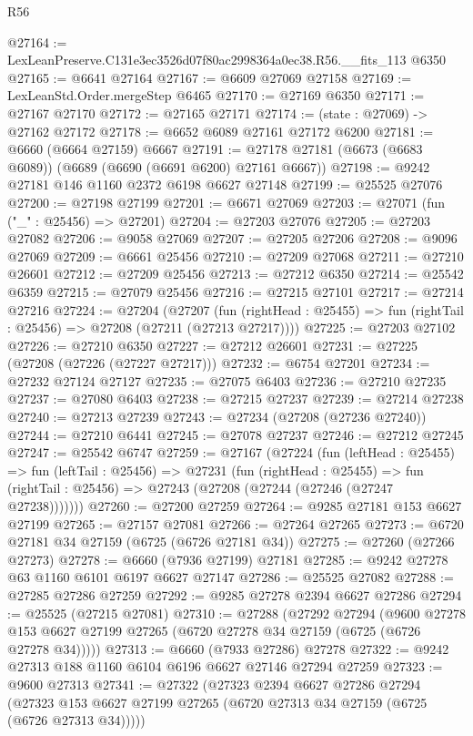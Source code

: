 \begin{lexlean}{R56}
\begin{coremodule}
@27164 := LexLeanPreserve.C131e3ec3526d07f80ac2998364a0ec38.R56.__fits_113 @6350
@27165 := @6641 @27164
@27167 := @6609 @27069 @27158
@27169 := LexLeanStd.Order.mergeStep @6465
@27170 := @27169 @6350
@27171 := @27167 @27170
@27172 := @27165 @27171
@27174 := (state : @27069) -> @27162 @27172
@27178 := @6652 @6089 @27161 @27172 @6200
@27181 := @6660 (@6664 @27159) @6667
@27191 := @27178 @27181 (@6673 (@6683 @6089)) (@6689 (@6690 (@6691 @6200) @27161 @6667))
@27198 := @9242 @27181 @146 @1160 @2372 @6198 @6627 @27148
@27199 := @25525 @27076
@27200 := @27198 @27199
@27201 := @6671 @27069
@27203 := @27071 (fun ("_" : @25456) => @27201)
@27204 := @27203 @27076
@27205 := @27203 @27082
@27206 := @9058 @27069
@27207 := @27205 @27206
@27208 := @9096 @27069
@27209 := @6661 @25456
@27210 := @27209 @27068
@27211 := @27210 @26601
@27212 := @27209 @25456
@27213 := @27212 @6350
@27214 := @25542 @6359
@27215 := @27079 @25456
@27216 := @27215 @27101
@27217 := @27214 @27216
@27224 := @27204
    (@27207
      (fun (rightHead : @25455) => fun (rightTail : @25456) => @27208 (@27211 (@27213 @27217))))
@27225 := @27203 @27102
@27226 := @27210 @6350
@27227 := @27212 @26601
@27231 := @27225 (@27208 (@27226 (@27227 @27217)))
@27232 := @6754 @27201
@27234 := @27232 @27124 @27127
@27235 := @27075 @6403
@27236 := @27210 @27235
@27237 := @27080 @6403
@27238 := @27215 @27237
@27239 := @27214 @27238
@27240 := @27213 @27239
@27243 := @27234 (@27208 (@27236 @27240))
@27244 := @27210 @6441
@27245 := @27078 @27237
@27246 := @27212 @27245
@27247 := @25542 @6747
@27259 := @27167
    (@27224
      (fun (leftHead : @25455) =>
      fun (leftTail : @25456) =>
      @27231
        (fun (rightHead : @25455) =>
        fun (rightTail : @25456) => @27243 (@27208 (@27244 (@27246 (@27247 @27238)))))))
@27260 := @27200 @27259
@27264 := @9285 @27181 @153 @6627 @27199
@27265 := @27157 @27081
@27266 := @27264 @27265
@27273 := @6720 @27181 @34 @27159 (@6725 (@6726 @27181 @34))
@27275 := @27260 (@27266 @27273)
@27278 := @6660 (@7936 @27199) @27181
@27285 := @9242 @27278 @63 @1160 @6101 @6197 @6627 @27147
@27286 := @25525 @27082
@27288 := @27285 @27286 @27259
@27292 := @9285 @27278 @2394 @6627 @27286
@27294 := @25525 (@27215 @27081)
@27310 := @27288
    (@27292
      @27294
      (@9600 @27278 @153 @6627 @27199 @27265 (@6720 @27278 @34 @27159 (@6725 (@6726 @27278 @34)))))
@27313 := @6660 (@7933 @27286) @27278
@27322 := @9242 @27313 @188 @1160 @6104 @6196 @6627 @27146 @27294 @27259
@27323 := @9600 @27313
@27341 := @27322
    (@27323
      @2394
      @6627
      @27286
      @27294
      (@27323 @153 @6627 @27199 @27265 (@6720 @27313 @34 @27159 (@6725 (@6726 @27313 @34)))))

\end{coremodule}
\end{lexlean}
